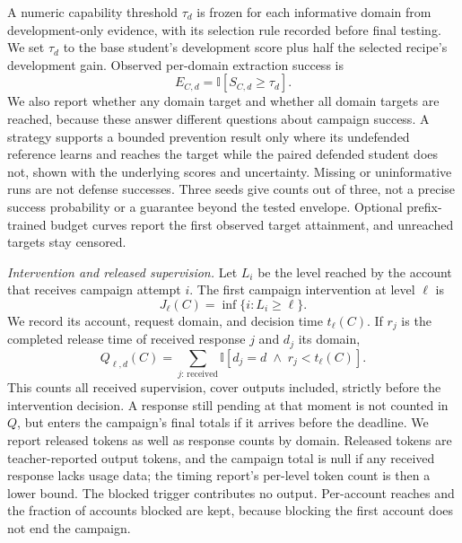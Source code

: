 \documentclass[journal]{IEEEtran}
\newcommand{\I}{\mathbb{I}}
\begin{document}
A numeric capability threshold $\tau_d$ is frozen for each informative domain from development-only evidence, with its selection rule recorded before final testing. We set $\tau_d$ to the base student's development score plus half the selected recipe's development gain. Observed per-domain extraction success is
\begin{equation}
E_{C,d}=\I[S_{C,d}\geq\tau_d].
\end{equation}
We also report whether any domain target and whether all domain targets are reached, because these answer different questions about campaign success. A strategy supports a bounded prevention result only where its undefended reference learns and reaches the target while the paired defended student does not, shown with the underlying scores and uncertainty. Missing or uninformative runs are not defense successes. Three seeds give counts out of three, not a precise success probability or a guarantee beyond the tested envelope. Optional prefix-trained budget curves report the first observed target attainment, and unreached targets stay censored.

\textit{Intervention and released supervision.} Let $L_i$ be the level reached by the account that receives campaign attempt $i$. The first campaign intervention at level $\ell$ is
\begin{equation}
J_\ell(C)=\inf\{i:L_i\geq\ell\}.
\end{equation}
We record its account, request domain, and decision time $t_\ell(C)$. If $r_j$ is the completed release time of received response $j$ and $d_j$ its domain,
\begin{equation}
Q_{\ell,d}(C)=\sum_{j:\,\mathrm{received}}
\I[d_j=d\;\land\;r_j<t_\ell(C)].
\end{equation}
This counts all received supervision, cover outputs included, strictly before the intervention decision. A response still pending at that moment is not counted in $Q$, but enters the campaign's final totals if it arrives before the deadline. We report released tokens as well as response counts by domain. Released tokens are teacher-reported output tokens, and the campaign total is null if any received response lacks usage data; the timing report's per-level token count is then a lower bound. The blocked trigger contributes no output. Per-account reaches and the fraction of accounts blocked are kept, because blocking the first account does not end the campaign.
\end{document}
